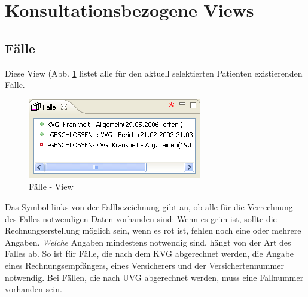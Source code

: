 

\section{Konsultationsbezogene Views}

\subsection{Fälle}
Diese View (Abb. \ref{fig:faelle2} listet alle für den aktuell selektierten
Patienten existierenden Fälle. 
\begin{figure}[htp]
\begin{center}
  \includegraphics{images/faelleview}
  \caption{Fälle - View}
  \label{fig:faelle2}
\end{center}
\end{figure}

Das Symbol links von der Fallbezeichnung gibt an, ob alle für die Verrechnung
des Falles notwendigen Daten vorhanden sind: Wenn es grün ist, sollte die
Rechnungserstellung möglich sein, wenn es rot ist, fehlen noch eine oder mehrere
Angaben. \textit{Welche} Angaben mindestens notwendig sind, hängt von der Art
des Falles ab. So ist für Fälle, die nach dem KVG abgerechnet werden, die Angabe
eines Rechnungsempfängers, eines Versicherers und der Versichertennummer
notwendig. Bei Fällen, die nach UVG abgerechnet werden, muss eine Fallnummer
vorhanden sein.

